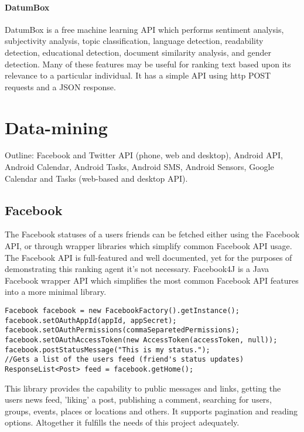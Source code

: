\paragraph{DatumBox}
DatumBox is a free machine learning API which performs sentiment analysis, subjectivity analysis, topic classification, language detection, readability detection, educational detection, document similarity analysis, and gender detection. Many of these features may be useful for ranking text based upon its relevance to a particular individual. It has a simple API using http POST requests and a JSON response. 

\section{Data-mining}

Outline: Facebook and Twitter API (phone, web and desktop), Android API, Android Calendar, Android Tasks, Android SMS, Android Sensors, Google Calendar and Tasks (web-based and desktop API).

\subsection{Facebook}
The Facebook statuses of a users friends can be fetched either using the Facebook API, or through wrapper libraries which simplify common Facebook API usage. The Facebook API is full-featured and well documented, yet for the purposes of demonstrating this ranking agent it's not necessary. 
Facebook4J is a Java Facebook wrapper API which simplifies the most common Facebook API features into a more minimal library. 

\begin{lstlisting}
Facebook facebook = new FacebookFactory().getInstance();
facebook.setOAuthAppId(appId, appSecret);
facebook.setOAuthPermissions(commaSeparetedPermissions);
facebook.setOAuthAccessToken(new AccessToken(accessToken, null));
facebook.postStatusMessage("This is my status.");
//Gets a list of the users feed (friend's status updates)
ResponseList<Post> feed = facebook.getHome();
\end{lstlisting}


This library provides the capability to public messages and links, getting the users news feed, 'liking' a post, publishing a comment, searching for users, groups, events, places or locations and others. It supports pagination and reading options. Altogether it fulfills the needs of this project adequately. 

